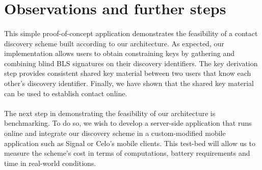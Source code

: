 \section{Observations and further steps}


\paragraph{} This simple proof-of-concept application demonstrates the feasibility of a contact discovery scheme built according to our architecture. As expected, our implementation allows users to obtain constraining keys by gathering and combining blind BLS signatures on their discovery identifiers. The key derivation step provides consistent shared key material between two users that know each other's discovery identifier. Finally, we have shown that the shared key material can be used to establish contact online.


\paragraph{} The next step in demonstrating the feasibility of our architecture is benchmarking. To do so, we wish to develop a server-side application that runs online and integrate our discovery scheme in a custom-modified mobile application such as Signal or Celo's mobile clients. This test-bed will allow us to measure the scheme's cost in terms of computations, battery requirements and time in real-world conditions.































